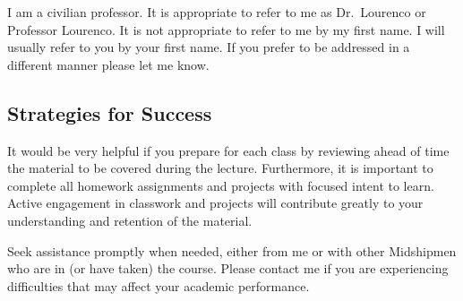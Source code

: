 \documentclass[letterpaper,hidelinks,oneside,11pt]{article}%
\begin{document}
I am a civilian professor. It is appropriate to refer to me as Dr.\ Lourenco or Professor Lourenco. It is not appropriate to refer to me by my first name. I will usually refer to you by your first name. If you prefer to be addressed in a different manner please let me know.

\subsection*{Strategies for Success}

It would be very helpful if you prepare for each class by reviewing ahead of time the material to be covered during the lecture. Furthermore, it is important to complete all homework assignments and projects with focused intent to learn. Active engagement in classwork and projects will contribute greatly to your understanding and retention of the material.

Seek assistance promptly when needed, either from me or with other Midshipmen who are in (or have taken) the course. Please contact me if you are experiencing difficulties that may affect your academic performance.




\end{document}
